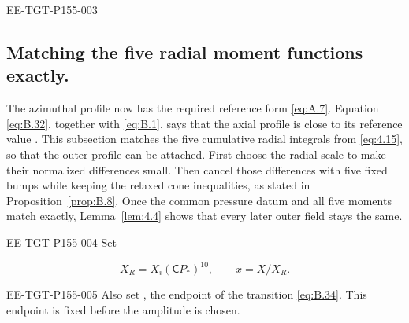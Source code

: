 \begin{EESegment}{EE-TGT-P155-003}
\subsection{Matching the five radial moment functions exactly.}\label{sec:B.8}
The azimuthal profile  now has the required reference form
\eqref{eq:A.7}. Equation \eqref{eq:B.32}, together with \eqref{eq:B.1}, says that the axial profile
 is close to its reference value . This
subsection matches the five cumulative radial integrals
 from \eqref{eq:4.15}, so that the outer profile can be attached.
First choose the radial scale  to make their normalized differences small.
Then cancel those differences with five fixed bumps while keeping the relaxed cone inequalities,
as stated in Proposition~\ref{prop:B.8}. Once the common pressure datum
 and all five moments match exactly, Lemma~\ref{lem:4.4} shows that every
later outer field stays the same.
\end{EESegment}

\begin{EESegment}{EE-TGT-P155-004}
Set
\end{EESegment}
\[
  X_R=X_i(\mathsf C P_*)^{10},
  \qquad
  x=X/X_R.
\]
\begin{EESegment}{EE-TGT-P155-005}
Also set , the endpoint of the
transition \eqref{eq:B.34}. This endpoint is fixed before the amplitude is chosen.
\end{EESegment}


